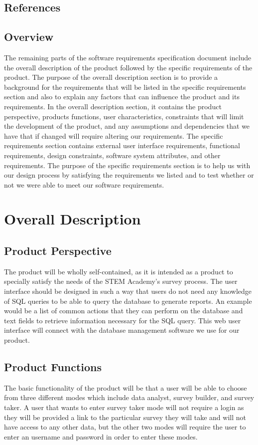 \subsection{References}
\subsection{Overview}
The remaining parts of the software requirements specification document include the overall description of the product followed by the specific requirements of the product.
 The purpose of the overall description section is to provide a background for the requirements that will be listed in the specific requirements section and also to explain any factors that can influence the product and its requirements. 
 In the overall description section, it contains the product perspective, products functions, user characteristics, constraints that will limit the development of the product, and any assumptions and dependencies that we have that if changed will require altering our requirements. 
The specific requirements section contains external user interface requirements, functional requirements, design constraints, software system attributes, and other requirements. 
The purpose of the specific requirements section is to help us with our design process by satisfying the requirements we listed and to test whether or not we were able to meet our software requirements.  
\section{Overall Description}

\subsection{Product Perspective}
The product will be wholly self-contained, as it is intended as a product to specially satisfy the needs of the STEM Academy's survey
process. The user interface should be designed in such a way that users do not need any knowledge of SQL queries to be able
to query the database to generate reports. An example would be a list of common actions that they can perform on the database
and text fields to retrieve information necessary for the SQL query. This web user interface will connect with the database management
software we use for our product.
\subsection{Product Functions}
The basic functionality of the product will be that a user will be able to choose from three different modes which include data analyst, survey builder, and survey taker. 
A user that wants to enter survey taker mode will not require a login as they will be provided a link to the particular survey they will take and will not have access to any other data, but the other two modes will require the user to enter an username and password in order to enter these modes. 

